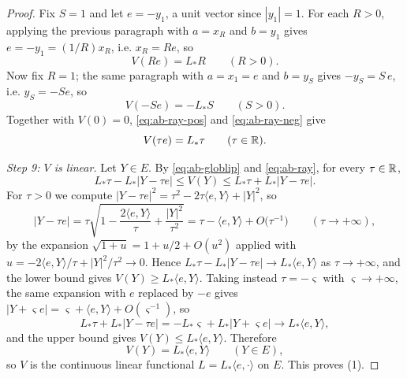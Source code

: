\begin{proof}
Fix $S=1$ and let $e=-y_1$, a unit vector since $|y_1|=1$. For each $R>0$,
applying the previous paragraph with $a=x_R$ and $b=y_1$ gives
$e=-y_1=(1/R)x_R$, i.e. $x_R=Re$, so
\begin{equation}\label{eq:ab-ray-pos}
  V(Re)=L_*R\qquad(R>0).
\end{equation}
Now fix $R=1$; the same paragraph with $a=x_1=e$ and $b=y_S$ gives
$-y_S=S\,e$, i.e. $y_S=-Se$, so
\begin{equation}\label{eq:ab-ray-neg}
  V(-Se)=-L_*S\qquad(S>0).
\end{equation}
Together with $V(0)=0$, \eqref{eq:ab-ray-pos} and \eqref{eq:ab-ray-neg} give
\begin{equation}\label{eq:ab-ray}
  V(\tau e)=L_*\tau\qquad(\tau\in\mathbb{R}).
\end{equation}

\emph{Step 9: $V$ is linear.}
Let $Y\in E$. By \eqref{eq:ab-globlip} and \eqref{eq:ab-ray}, for every
$\tau\in\mathbb{R}$,
\[
  L_*\tau-L_*|Y-\tau e|\le V(Y)\le L_*\tau+L_*|Y-\tau e| .
\]
For $\tau>0$ we compute
$|Y-\tau e|^2=\tau^2-2\tau\langle e,Y\rangle+|Y|^2$, so
\[
  |Y-\tau e|=\tau\sqrt{1-\frac{2\langle e,Y\rangle}{\tau}+\frac{|Y|^2}{\tau^2}}
   =\tau-\langle e,Y\rangle+O\bigl(\tau^{-1}\bigr)
   \qquad(\tau\to+\infty),
\]
by the expansion $\sqrt{1+u}=1+u/2+O(u^2)$ applied with
$u=-2\langle e,Y\rangle/\tau+|Y|^2/\tau^2\to0$. Hence
$L_*\tau-L_*|Y-\tau e|\to L_*\langle e,Y\rangle$ as $\tau\to+\infty$, and the
lower bound gives $V(Y)\ge L_*\langle e,Y\rangle$. Taking instead
$\tau=-\varsigma$ with $\varsigma\to+\infty$, the same expansion with $e$
replaced by $-e$ gives
$|Y+\varsigma e|=\varsigma+\langle e,Y\rangle+O(\varsigma^{-1})$, so
\[
  L_*\tau+L_*|Y-\tau e|=-L_*\varsigma+L_*|Y+\varsigma e|
   \longrightarrow L_*\langle e,Y\rangle ,
\]
and the upper bound gives $V(Y)\le L_*\langle e,Y\rangle$. Therefore
\[
  V(Y)=L_*\langle e,Y\rangle\qquad(Y\in E),
\]
so $V$ is the continuous linear functional $L=L_*\langle e,\cdot\rangle$ on $E$.
This proves (1).
\end{proof}
